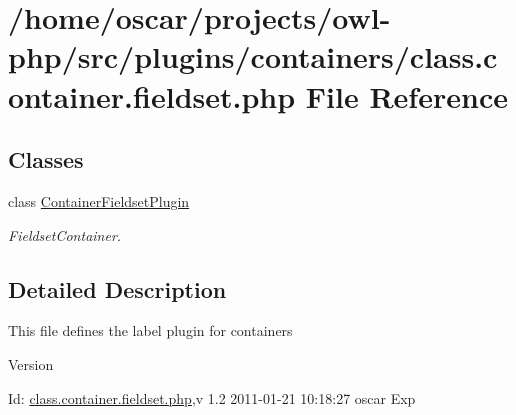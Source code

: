 \section{/home/oscar/projects/owl-\/php/src/plugins/containers/class.container.fieldset.php File Reference}
\label{class_8container_8fieldset_8php}
\subsection*{Classes}
\begin{DoxyCompactItemize}
\item 
class \hyperlink{classContainerFieldsetPlugin}{ContainerFieldsetPlugin}
\begin{DoxyCompactList}\small\item\em FieldsetContainer. \item\end{DoxyCompactList}\end{DoxyCompactItemize}


\subsection{Detailed Description}
This file defines the label plugin for containers \begin{DoxyVersion}{Version}

\end{DoxyVersion}
\begin{DoxyParagraph}{Id:}
\hyperlink{class_8container_8fieldset_8php}{class.container.fieldset.php},v 1.2 2011-\/01-\/21 10:18:27 oscar Exp 
\end{DoxyParagraph}
